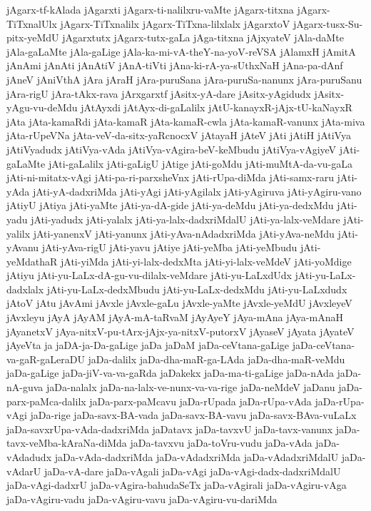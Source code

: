 {jAgarx-tf-kAlada
jAgarxti
jAgarx-ti-nalilxru-vaMte
jAgarx-titxna
jAgarx-TiTxnalUlx
jAgarx-TiTxnalilx
jAgarx-TiTxna-lilxlalx
jAgarxtoV
jAgarx-tusx-Su-pitx-yeMdU
jAgarxtutx
jAgarx-tutx-gaLa
jAga-titxna
jAjxyateV
jAla-daMte
jAla-gaLaMte
jAla-gaLige
jAla-ka-mi-vA-theY-na-yoV-reVSA
jAlamxH
jAmitA
jAnAmi
jAnAti
jAnAtiV
jAnA-tiVti
jAna-ki-rA-ya-sUthxNaH
jAna-pa-dAnf
jAneV
jAniVthA
jAra
jAraH
jAra-puruSana
jAra-puruSa-nanunx
jAra-puruSanu
jAra-rigU
jAra-tAkx-rava
jArxgarxtf
jAsitx-yA-dare
jAsitx-yAgidudx
jAsitx-yAgu-vu-deMdu
jAtAyxdi
jAtAyx-di-gaLalilx
jAtU-kanayxR-jAjx-tU-kaNayxR
jAta
jAta-kamaRdi
jAta-kamaR
jAta-kamaR-cwla
jAta-kamaR-vanunx
jAta-miva
jAta-rUpeVNa
jAta-veV-da-sitx-yaRcnocxV
jAtayaH
jAteV
jAti
jAtiH
jAtiVya
jAtiVyadudx
jAtiVya-vAda
jAtiVya-vAgira-beV-keMbudu
jAtiVya-vAgiyeV
jAti-gaLaMte
jAti-gaLalilx
jAti-gaLigU
jAtige
jAti-goMdu
jAti-muMtA-da-vu-gaLa
jAti-ni-mitatx-vAgi
jAti-pa-ri-parxsheVnx
jAti-rUpa-diMda
jAti-samx-raru
jAti-yAda
jAti-yA-dadxriMda
jAti-yAgi
jAti-yAgilalx
jAti-yAgiruva
jAti-yAgiru-vano
jAtiyU
jAtiya
jAti-yaMte
jAti-ya-dA-gide
jAti-ya-deMdu
jAti-ya-dedxMdu
jAti-yadu
jAti-yadudx
jAti-yalalx
jAti-ya-lalx-dadxriMdalU
jAti-ya-lalx-veMdare
jAti-yalilx
jAti-yanenxV
jAti-yanunx
jAti-yAva-nAdadxriMda
jAti-yAva-neMdu
jAti-yAvanu
jAti-yAva-rigU
jAti-yavu
jAtiye
jAti-yeMba
jAti-yeMbudu
jAti-yeMdathaR
jAti-yiMda
jAti-yi-lalx-dedxMta
jAti-yi-lalx-veMdeV
jAti-yoMdige
jAtiyu
jAti-yu-LaLx-dA-gu-vu-dilalx-veMdare
jAti-yu-LaLxdUdx
jAti-yu-LaLx-dadxlalx
jAti-yu-LaLx-dedxMbudu
jAti-yu-LaLx-dedxMdu
jAti-yu-LaLxdudx
jAtoV
jAtu
jAvAmi
jAvxle
jAvxle-gaLu
jAvxle-yaMte
jAvxle-yeMdU
jAvxleyeV
jAvxleyu
jAyA
jAyAM
jAyA-mA-taRvaM
jAyAyeY
jAya-mAna
jAya-mAnaH
jAyanetxV
jAya-nitxV-pu-tArx-jAjx-ya-nitxV-putorxV
jAyaseV
jAyata
jAyateV
jAyeVta
ja
jaDA-ja-Da-gaLige
jaDa
jaDaM
jaDa-ceVtana-gaLige
jaDa-ceVtana-va-gaR-gaLeraDU
jaDa-dalilx
jaDa-dha-maR-ga-LAda
jaDa-dha-maR-veMdu
jaDa-gaLige
jaDa-jiV-va-va-gaRda
jaDakekx
jaDa-ma-ti-gaLige
jaDa-nAda
jaDa-nA-guva
jaDa-nalalx
jaDa-na-lalx-ve-nunx-va-va-rige
jaDa-neMdeV
jaDanu
jaDa-parx-paMca-dalilx
jaDa-parx-paMcavu
jaDa-rUpada
jaDa-rUpa-vAda
jaDa-rUpa-vAgi
jaDa-rige
jaDa-savx-BA-vada
jaDa-savx-BA-vavu
jaDa-savx-BAva-vuLaLx
jaDa-savxrUpa-vAda-dadxriMda
jaDatavx
jaDa-tavxvU
jaDa-tavx-vanunx
jaDa-tavx-veMba-kAraNa-diMda
jaDa-tavxvu
jaDa-toVru-vudu
jaDa-vAda
jaDa-vAdadudx
jaDa-vAda-dadxriMda
jaDa-vAdadxriMda
jaDa-vAdadxriMdalU
jaDa-vAdarU
jaDa-vA-dare
jaDa-vAgali
jaDa-vAgi
jaDa-vAgi-dadx-dadxriMdalU
jaDa-vAgi-dadxrU
jaDa-vAgira-bahudaSeTx
jaDa-vAgirali
jaDa-vAgiru-vAga
jaDa-vAgiru-vadu
jaDa-vAgiru-vavu
jaDa-vAgiru-vu-dariMda
}
